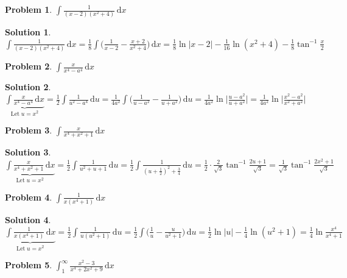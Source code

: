 \documentclass[11pt,a4paper]{article}
\newcommand{\ds}{\displaystyle}
\theoremstyle{definition}
\newtheorem*{problem}{Problem}
\newtheorem*{solution}{Solution}
\begin{document}
\begin{problem}
  $\ds\int\!\frac{1}{(x - 2)(x^2 + 4)}\,\text{d}x$
\end{problem}

\begin{solution}
  $\ds\int\!\frac{1}{(x - 2)(x^2 + 4)}\,\text{d}x = \frac{1}{8}\int\!\bigg(\frac{1}{x - 2} - \frac{x + 2}{x^2 + 4}\bigg)\,\text{d}x = \frac{1}{8}\ln|x - 2| - \frac{1}{16}\ln(x^2 + 4) - \frac{1}{8}\tan^{-1}\frac{x}{2}$
\end{solution}

\begin{problem}
  $\ds\int\!\frac{x}{x^4 - a^4}\,\text{d}x$
\end{problem}

\begin{solution}
  $\ds\underbrace{\int\!\frac{x}{x^4 - a^4}\,\text{d}x}_{\text{Let}\; u = x^2} = \frac{1}{2}\int\!\frac{1}{u^2 - a^4}\,\text{d}u = \frac{1}{4a^2}\int\!\bigg(\frac{1}{u - a^2} - \frac{1}{u + a^2}\bigg)\,\text{d}u = \frac{1}{4a^2}\ln\bigg|\frac{u - a^2}{u + a^2}\bigg| = \frac{1}{4a^2}\ln\bigg|\frac{x^2 - a^2}{x^2 + a^2}\bigg|$
\end{solution}

\begin{problem}
  $\ds\int\!\frac{x}{x^4 + x^2 + 1}\,\text{d}x$
\end{problem}

\begin{solution}
  $\ds\underbrace{\int\!\frac{x}{x^4 + x^2 + 1}\,\text{d}x}_{\text{Let}\; u = x^2} = \frac{1}{2}\int\!\frac{1}{u^2 + u + 1}\,\text{d}u = \frac{1}{2}\int\!\frac{1}{(u + \frac{1}{2})^2 + \frac{3}{4}}\,\text{d}u = \frac{1}{2}\cdot\frac{2}{\sqrt{3}}\tan^{-1}\frac{2u + 1}{\sqrt{3}} = \frac{1}{\sqrt{3}}\tan^{-1}\frac{2x^2 + 1}{\sqrt{3}}$
\end{solution}

\begin{problem}
  $\ds\int\!\frac{1}{x(x^4 + 1)}\,\text{d}x$
\end{problem}

\begin{solution}
  $\ds\underbrace{\int\!\frac{1}{x(x^4 + 1)}\,\text{d}x}_{\text{Let}\; u = x^2} = \frac{1}{2}\int\!\frac{1}{u(u^2 + 1)}\,\text{d}u = \frac{1}{2}\int\!\bigg(\frac{1}{u} - \frac{u}{u^2 + 1}\bigg)\,\text{d}u = \frac{1}{2}\ln|u| - \frac{1}{4}\ln(u^2 + 1) = \frac{1}{4}\ln\frac{x^4}{x^4 + 1}$
\end{solution}

\begin{problem}
  $\ds\int_1^\infty\!\!\frac{x^2 - 3}{x^4 + 2x^2 + 9}\,\text{d}x$
\end{problem}
\end{document}
